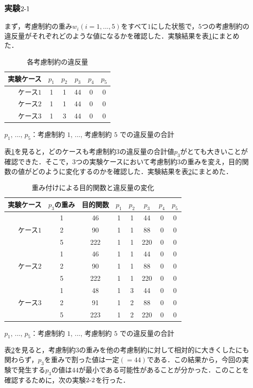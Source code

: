 \documentclass[a4paper,12pt,fleqn]{jarticle}
\begin{document}
\subsubsection{実験$2\mathchar`-1$}
まず，考慮制約の重み$w_i(i=1,...,5)$をすべて$1$にした状態で，$5$つの考慮制約の違反量がそれぞれどのような値になるかを確認した．実験結果を表\ref{tb:jikkeny2}にまとめた．
\begin{table}[H]
  \begin{center}
    \caption{各考慮制約の違反量}
    \label{tb:jikkeny2}
    \begin{tabular}{r|ccccc} \toprule
     実験ケース & $p_1$ & $p_2$ & $p_3$ & $p_4$ & $p_5$ \\ \toprule
     ケース$1$ & 1 & 1 & 44 & 0 & 0 \\
     ケース$2$ & 1 & 1 & 44 & 0 & 0 \\ 
     ケース$3$ & 1 & 3 & 44 & 0 & 0 \\ \bottomrule
      \end{tabular}
  \end{center}
 \hspace{3cm} $ p_1$, ..., $p_5$：考慮制約 $1$, ..., 考慮制約 $5$ での違反量の合計
\end{table}
表\ref{tb:jikkeny2}を見ると，どのケースも考慮制約$3$の違反量の合計値$p_3$がとても大きいことが確認できた．そこで，$3$つの実験ケースにおいて考慮制約$3$の重みを変え，目的関数の値がどのように変化するのかを確認した．実験結果を表\ref{tb:hyou8}にまとめた．
\begin{table}[H]
  \begin{center}
    \caption{重み付けによる目的関数と違反量の変化}
    \label{tb:hyou8}
    \begin{tabular}{r|ccccccc} \toprule
     実験ケース & $p_3$の重み & 目的関数 & $p_1$ & $p_2$ & $p_3$ & $p_4$ & $p_5$ \\ \toprule
      & 1 & 46 & 1 & 1 & 44 & 0 & 0 \\ \cline{2-8}
    ケース$1$ & 2 & 90 & 1 & 1 & 88 & 0 & 0 \\ \cline{2-8}
      & 5 & 222 & 1 & 1 & 220 & 0 & 0 \\ \hline
        & 1 & 46 & 1 & 1 & 44 & 0 & 0 \\ \cline{2-8}
    ケース$2$ & 2 & 90 & 1 & 1 & 88 & 0 & 0 \\ \cline{2-8}
      & 5 & 222 & 1 & 1 & 220 & 0 & 0 \\ \hline
        & 1 & 48 & 1 & 3 & 44 & 0 & 0 \\ \cline{2-8}  
    ケース$3$ & 2 & 91 & 1 & 2 & 88 & 0 & 0 \\ \cline{2-8}
      & 5 & 223 & 1 & 2 & 220 & 0 & 0 \\ \toprule
      \end{tabular}
  \end{center}
  \hspace{2cm} $p_1$, ..., $p_5$：考慮制約 $1$, ..., 考慮制約 $5$ での違反量の合計
\end{table}
表\ref{tb:hyou8}を見ると，考慮制約$3$の重みを他の考慮制約に対して相対的に大きくしたにも関わらず，$p_3$を重みで割った値は一定$(=44)$である．この結果から，今回の実験で発生する$p_3$の値は$44$が最小である可能性があることが分かった．このことを確認するために，次の実験$2\mathchar`-2$を行った．
\end{document}
